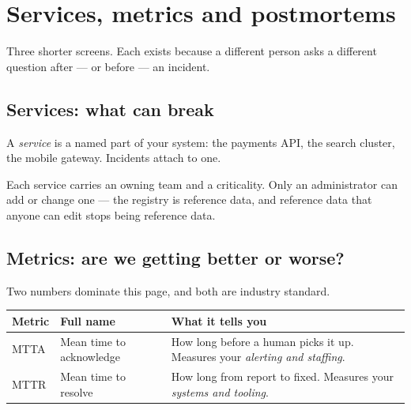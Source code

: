 \chapter{Services, metrics and postmortems}
\label{ch:screens}

Three shorter screens. Each exists because a different person asks a different
question after --- or before --- an incident.

\section{Services: what can break}


A \emph{service} is a named part of your system: the payments API, the search
cluster, the mobile gateway. Incidents attach to one.


Each service carries an owning team and a criticality. Only an administrator can
add or change one --- the registry is reference data, and reference data that
anyone can edit stops being reference data.

\section{Metrics: are we getting better or worse?}


Two numbers dominate this page, and both are industry standard.

\begin{center}
\begin{tabular}{@{}>{\raggedright\arraybackslash}p{2.2cm}>{\raggedright\arraybackslash}p{4.4cm}p{7.2cm}@{}}
\toprule
\textbf{Metric} & \textbf{Full name} & \textbf{What it tells you} \\
\midrule
MTTA & Mean time to acknowledge & How long before a human picks it up. Measures your \emph{alerting and staffing}. \\
MTTR & Mean time to resolve & How long from report to fixed. Measures your \emph{systems and tooling}. \\
\bottomrule
\end{tabular}
\end{center}


